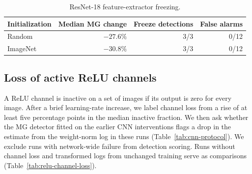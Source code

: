 {\begin{table}[!htbp]
\centering\small
\caption{ResNet-18 feature-extractor freezing.}
\label{tab:resnet-freeze}
\begin{tabular}{lrrr}
\toprule
Initialization & Median MG change & Freeze detections & False alarms \\
\midrule
Random & $-27.6\%$ & 3/3 & 0/12 \\
ImageNet & $-30.8\%$ & 3/3 & 0/12 \\
\bottomrule
\end{tabular}
\end{table}

\subsection[Loss of active ReLU channels]{Loss of active ReLU channels}
A ReLU channel is inactive on a set of images if its output is zero for every image. After a brief learning-rate increase, we label channel loss from a rise of at least five percentage points in the median inactive fraction. We then ask whether the MG detector fitted on the earlier CNN interventions flags a drop in the estimate from the weight-norm log in these runs (Table~\ref{tab:cnn-protocol}). We exclude runs with network-wide failure from detection scoring. Runs without channel loss and transformed logs from unchanged training serve as comparisons (Table~\ref{tab:relu-channel-loss}).

}
